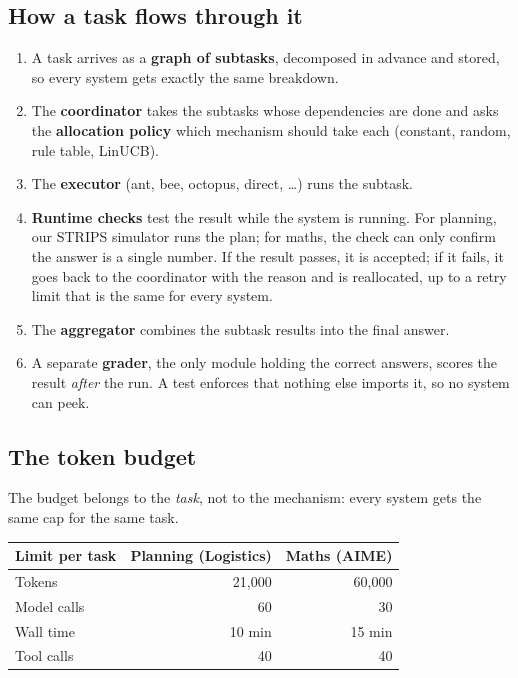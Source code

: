 \documentclass[11pt,a4paper]{article}
\begin{document}
\subsection{How a task flows through it}
\begin{enumerate}
  \item A task arrives as a \textbf{graph of subtasks}, decomposed in advance and stored, so every system
        gets exactly the same breakdown.
  \item The \textbf{coordinator} takes the subtasks whose dependencies are done and asks the
        \textbf{allocation policy} which mechanism should take each (constant, random, rule table, LinUCB).
  \item The \textbf{executor} (ant, bee, octopus, direct, \ldots) runs the subtask.
  \item \textbf{Runtime checks} test the result while the system is running. For planning, our STRIPS
        simulator runs the plan; for maths, the check can only confirm the answer is a single number.
        If the result passes, it is accepted; if it fails, it goes back to the coordinator with the reason and
        is reallocated, up to a retry limit that is the same for every system.
  \item The \textbf{aggregator} combines the subtask results into the final answer.
  \item A separate \textbf{grader}, the only module holding the correct answers, scores the result
        \emph{after} the run. A test enforces that nothing else imports it, so no system can peek.
\end{enumerate}

\subsection{The token budget}
The budget belongs to the \emph{task}, not to the mechanism: every system gets the same cap for the same task.

\begin{tabularx}{\linewidth}{@{}Lrr@{}}
\toprule
\textbf{Limit per task} & \textbf{Planning (Logistics)} & \textbf{Maths (AIME)} \\
\midrule
Tokens & 21,000 & 60,000 \\
Model calls & 60 & 30 \\
Wall time & 10 min & 15 min \\
Tool calls & 40 & 40 \\
\bottomrule
\end{tabularx}
\end{document}
